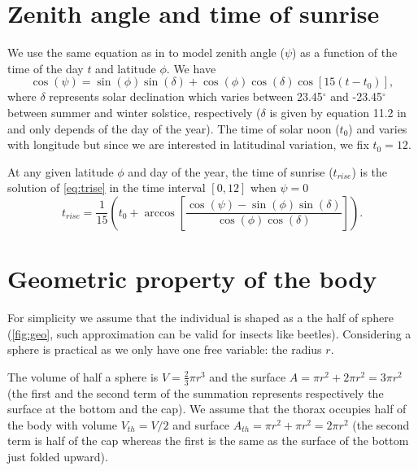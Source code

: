 \documentclass[11pt]{article}
\date{\vspace{-5ex}}
\begin{document}
\maketitle


\section{Zenith angle and time of sunrise}
We use the same equation as in \citet{Campbell2012} to model zenith angle ($\psi$) as a function of the time of the day $t$ and latitude $\phi$.
We have
\begin{equation}  \label{eq:psi}
\cos(\psi) = \sin(\phi) \sin(\delta) + \cos(\phi) \cos(\delta) \cos[15 (t- t_0)],
\end{equation}
where $\delta$ represents solar declination which varies between 23.45$^\circ$ and  -23.45$^\circ$ between summer and winter solstice, respectively ($\delta$ is given by equation 11.2 in \citet{Campbell2012} and only depends of the day of the year).
The time of solar noon ($t_0$) and varies with longitude but since we are interested in latitudinal variation, we fix $t_0 = 12$.

At any given latitude $\phi$ and day of the year, the time of sunrise ($t_{rise}$) is the solution of \cref{eq:trise} in the time interval $[0,12]$ when $\psi = 0$
%
\begin{equation} \label{eq:trise}
t_{rise} =  \frac{1}{15} \left( t_0 +  \arccos \left[ \frac{\cos(\psi) - \sin(\phi) \sin(\delta)}{\cos(\phi) \cos(\delta)} \right] \right).
\end{equation}
%
\section{Geometric property of the body}
For simplicity we assume that the individual is shaped as a the half of sphere (\cref{fig:geo}, such approximation can be valid for insects like beetles).
Considering a sphere is practical as we only have one free variable:  the radius $r$.

The volume of half a sphere is $V = \frac{2}{3} \pi r^3$ and the surface $A = \pi r^2 + 2 \pi r^ 2 = 3 \pi r^2$ (the first and the second term of the summation represents  respectively the surface at the bottom and the cap).
We assume that the thorax occupies half of the body with volume $V_{th} = V/2$ and surface $A_{th} = \pi r^2 + \pi r^2 = 2 \pi r^2$ (the second term is half of the cap whereas the first is the same as the surface of the bottom just folded upward).
\end{document}
